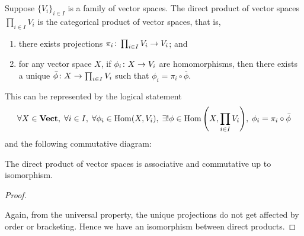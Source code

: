 \begin{definition}
    Suppose \({\{V_i\}}_{i \in I}\) is a family of vector spaces.
    The direct product of vector spaces \(\prod_{i \in I} V_i\)
    is the categorical product of vector spaces, that is,
    \begin{enumerate}[label={(\roman*)}, itemsep=0mm]
        \item there exists projections \(\pi_i\colon\prod_{i \in I} V_i\to V_i\); and
        \item for any vector space \(X\), if \(\phi_i\colon X\to V_i\) are homomorphisms,
            then there exists a unique \(\bar{\phi}\colon X\to\prod_{i \in I} V_i\)
            such that \(\phi_i = \pi_i\circ\bar{\phi}\).
    \end{enumerate}

    This can be represented by the logical statement
    \begin{equation*}
        \forall X \in \mathbf{Vect},\;
        \forall i \in I,\;
        \forall \phi_i \in \operatorname{Hom}(X,V_i),\;
        \exists! \phi \in \operatorname{Hom}\qty(X,\prod_{i \in I} V_i),\;
        \phi_i = \pi_i \circ \bar{\phi}
    \end{equation*}
    and the following commutative diagram:
    \begin{center}
    \end{center}
\end{definition}

\begin{theorem}
    The direct product of vector spaces is associative and commutative up to isomorphism.
\end{theorem}
\begin{proof}
    \begin{center}
    \end{center}
    Again, from the universal property,
    the unique projections do not get affected by order or bracketing.
    Hence we have an isomorphism between direct products.
\end{proof}

